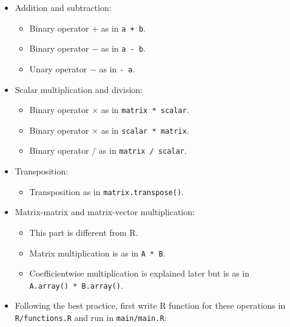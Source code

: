 \documentclass[]{book}
\providecommand{\tightlist}{%
  \setlength{\itemsep}{0pt}\setlength{\parskip}{0pt}}
\begin{document}
\begin{itemize}
\tightlist
\item
  Addition and subtraction:

  \begin{itemize}
  \tightlist
  \item
    Binary operator \(+\) as in \texttt{a\ +\ b}.
  \item
    Binary operator \(-\) as in \texttt{a\ -\ b}.
  \item
    Unary operator \(-\) as in \texttt{-\ a}.
  \end{itemize}
\item
  Scalar multiplication and division:

  \begin{itemize}
  \tightlist
  \item
    Binary operator \(\times\) as in \texttt{matrix\ *\ scalar}.
  \item
    Binary operator \(\times\) as in \texttt{scalar\ *\ matrix}.
  \item
    Binary operator \(/\) as in \texttt{matrix\ /\ scalar}.
  \end{itemize}
\item
  Transposition:

  \begin{itemize}
  \tightlist
  \item
    Transposition as in \texttt{matrix.transpose()}.
  \end{itemize}
\item
  Matrix-matrix and matrix-vector multiplication:

  \begin{itemize}
  \tightlist
  \item
    This part is different from R.
  \item
    Matrix multiplication is as in \texttt{A\ *\ B}.
  \item
    Coefficientwise multiplication is explained later but is as in
    \texttt{A.array()\ *\ B.array()}.
  \end{itemize}
\item
  Following the best practice, first write R function for these
  operations in \texttt{R/functions.R} and run in \texttt{main/main.R}:
\end{itemize}
\end{document}
